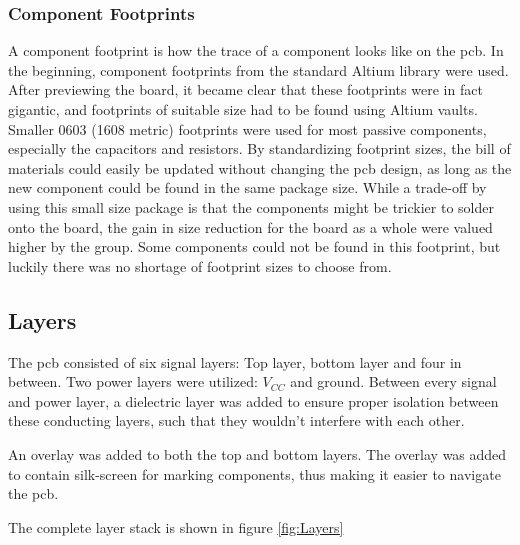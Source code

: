 \subsubsection{Component Footprints}
A component footprint is how the trace of a component looks like on the \gls{pcb}.
In the beginning, component footprints from the standard Altium library were used.
After previewing the board, it became clear that these footprints were in fact gigantic, and footprints of suitable size had to be found using Altium vaults.
Smaller 0603 (1608 metric) footprints were used for most passive components, especially the capacitors and resistors.
By standardizing footprint sizes, the bill of materials could easily be updated without changing the \gls{pcb} design, as long as the new component could be found in the same package size.
While a trade-off by using this small size package is that the components might be trickier to solder onto the board, the gain in size reduction for the board as a whole were valued higher by the group.
Some components could not be found in this footprint, but luckily there was no shortage of footprint sizes to choose from.

\subsection{Layers}
The \gls{pcb} consisted of six signal layers: Top layer, bottom layer and four in between.
Two power layers were utilized: \(V_{CC}\) and ground.
Between every signal and power layer, a dielectric layer was added to ensure proper isolation between these conducting layers, such that they wouldn't interfere with each other.

An overlay was added to both the top and bottom layers.
The overlay was added to contain silk-screen for marking components, thus making it easier to navigate the \gls{pcb}.

The complete layer stack is shown in figure \ref{fig:Layers}

